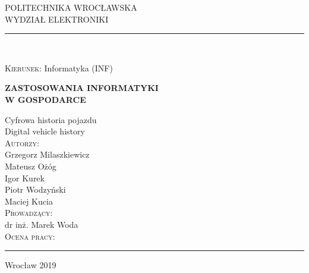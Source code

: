 \documentclass[12pt]{article}
\begin{document}
\begin{titlepage}

 \newcommand{\LINE}{\rule{\linewidth}{0.1mm}}
\begin{center}
 \LARGE  POLITECHNIKA WROC\L{}AWSKA \\[0mm] %
  WYDZIAŁ ELEKTRONIKI            %
  \vspace{-6mm}%
  
  \LINE \\[0.1cm]
\end{center}

\textsc{Kierunek:}  \hspace{15mm} Informatyka (INF) \\[0.5cm]

\begin{center}
\large \textbf{ZASTOSOWANIA INFORMATYKI} \\
\textbf{W GOSPODARCE} \\ [1cm]
\end{center}

\normalsize

\begin{center}
\hspace{55mm}Cyfrowa historia pojazdu\\[0.5cm]
\hspace{55mm}Digital vehicle history \\[0.5cm]
\hspace{55mm}\textsc{Autorzy:}  \\[0.1cm]
\hspace{55mm}Grzegorz Milaszkiewicz \\
\hspace{55mm}Mateusz Ożóg \\
\hspace{55mm}Igor Kurek\\
\hspace{55mm}Piotr Wodzyński\\
\hspace{55mm}Maciej Kucia \\[2.0cm]

\hspace{5mm}\textsc{Prowadzący:} \\
\hspace{15mm}dr inż. Marek Woda \\[1.2cm]

\hspace{6mm}\textsc{Ocena pracy:} \\[1.72cm]

\end{center}


\LINE
\center Wrocław 2019
\end{titlepage}
\renewcommand{\contentsname}{Spis treści}
\tableofcontents
\newpage
\end{document}
